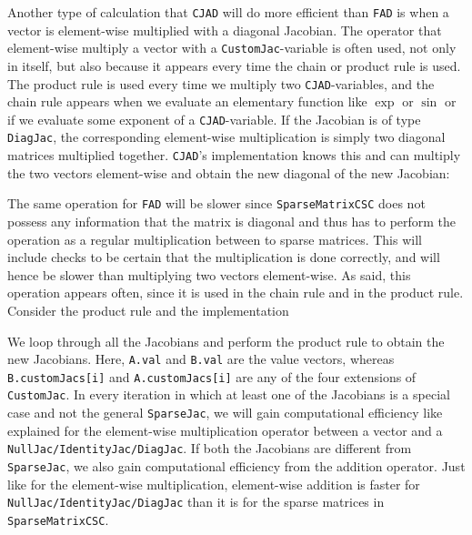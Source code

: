 Another type of calculation that \texttt{CJAD} will do more efficient than \texttt{FAD} is when a vector is element-wise multiplied with a diagonal Jacobian. The operator that element-wise multiply a vector with a \texttt{CustomJac}-variable is often used, not only in itself, but also because it appears every time the chain or product rule is used. The product rule is used every time we multiply two \texttt{CJAD}-variables, and the chain rule appears when we evaluate an elementary function like $\exp$ or $\sin$ or if we evaluate some exponent of a \texttt{CJAD}-variable. If the Jacobian is of type \texttt{DiagJac}, the corresponding element-wise multiplication is simply two diagonal matrices multiplied together. \texttt{CJAD}'s implementation knows this and can multiply the two vectors element-wise and obtain the new diagonal of the new Jacobian:

The same operation for \texttt{FAD} will be slower since \texttt{SparseMatrixCSC} does not possess any information that the matrix is diagonal and thus has to perform the operation as a regular multiplication between to sparse matrices. This will include checks to be certain that the multiplication is done correctly, and will hence be slower than multiplying two vectors element-wise. As said, this operation appears often, since it is used in the chain rule and in the product rule. Consider the product rule and the implementation

We loop through all the Jacobians and perform the product rule to obtain the new Jacobians.  Here, \texttt{A.val} and \texttt{B.val} are the value vectors, whereas \texttt{B.customJacs[i]} and \texttt{A.customJacs[i]} are any of the four extensions of \texttt{CustomJac}. In every iteration in which at least one of the Jacobians is a special case and not the general \texttt{SparseJac}, we will gain computational efficiency like explained for the element-wise multiplication operator between a vector and a \texttt{NullJac/IdentityJac/DiagJac}. If both the Jacobians are different from \texttt{SparseJac}, we also gain computational efficiency from the addition operator. Just like for the element-wise multiplication, element-wise addition is faster for \texttt{NullJac/IdentityJac/DiagJac} than it is for the sparse matrices in \texttt{SparseMatrixCSC}.

